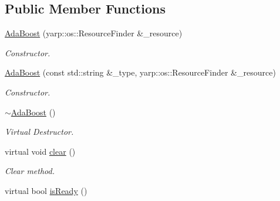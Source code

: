 \subsection*{Public Member Functions}
\begin{DoxyCompactItemize}
\item 
\hyperlink{classiCub_1_1boostMIL_1_1AdaBoost_a3e966db5adfa4d9e7b2a07cc6b1f6656}{Ada\+Boost} (yarp\+::os\+::\+Resource\+Finder \&\+\_\+resource)
\begin{DoxyCompactList}\small\item\em Constructor. \end{DoxyCompactList}\item 
\hyperlink{classiCub_1_1boostMIL_1_1AdaBoost_aee4a67b097b7aea76fed4cead509a522}{Ada\+Boost} (const std\+::string \&\+\_\+type, yarp\+::os\+::\+Resource\+Finder \&\+\_\+resource)
\begin{DoxyCompactList}\small\item\em Constructor. \end{DoxyCompactList}\item 
\hyperlink{classiCub_1_1boostMIL_1_1AdaBoost_abb7643eeabfae8887888a5fb8ed36f4d}{$\sim$\+Ada\+Boost} ()\label{classiCub_1_1boostMIL_1_1AdaBoost_abb7643eeabfae8887888a5fb8ed36f4d}

\begin{DoxyCompactList}\small\item\em Virtual Destructor. \end{DoxyCompactList}\item 
virtual void \hyperlink{classiCub_1_1boostMIL_1_1AdaBoost_ad371e92c03334ab33b2866b0a2eaab4b}{clear} ()\label{classiCub_1_1boostMIL_1_1AdaBoost_ad371e92c03334ab33b2866b0a2eaab4b}

\begin{DoxyCompactList}\small\item\em Clear method. \end{DoxyCompactList}\item 
virtual bool \hyperlink{classiCub_1_1boostMIL_1_1AdaBoost_a65614f8cdb3aed3aa74a7a8ac829ab83}{is\+Ready} ()\label{classiCub_1_1boostMIL_1_1AdaBoost_a65614f8cdb3aed3aa74a7a8ac829ab83}


\end{DoxyCompactItemize}
